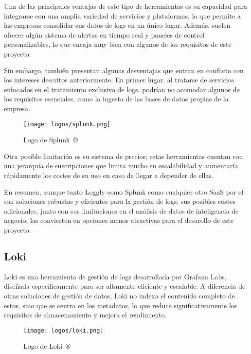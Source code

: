 Una de las principales ventajas de este tipo de herramientas es su capacidad
para integrarse con una amplia variedad de servicios y plataformas, lo que
permite a las empresas consolidar sus datos de logs en un único lugar. Además,
suelen ofrecer algún sistema de alertas en tiempo real y paneles de control
personalizables, lo que encaja muy bien con algunos de los requisitos de este
proyecto.

Sin embargo, también presentan algunas desventajas que entran en conflicto con
los intereses descritos anteriormente. En primer lugar, al tratarse de
servicios enfocados en el tratamiento exclusivo de logs, podrían no acomodar
algunos de los requisitos esenciales, como la ingesta de las bases de datos
propias de la empresa.

\begin{figure}[H]
	\centering
	\texttt{[image: logos/splunk.png]}
	\caption{Logo de Splunk~®}
\end{figure}

Otra posible limitación es su sistema de precios; estas herramientas cuentan con
una jerarquía de suscripciones que limita mucho su escalabilidad y aumentaría
rápidamente los costes de su uso en caso de llegar a depender de ellas.

En resumen, aunque tanto Loggly como Splunk como cualquier otro SaaS por el
son soluciones robustas y eficientes para la gestión de logs, sus posibles
costes adicionales, junto con sus limitaciones en el análisis de datos de
inteligencia de negocio, las convierten en opciones menos atractivas para el
desarollo de este proyecto.

\subsection{Loki}
Loki es una herramienta de gestión de logs desarrollada por Grafana Labs,
diseñada específicamente para ser altamente eficiente y escalable. A diferencia
de otras soluciones de gestión de datos, Loki no indexa el contenido completo de
estos, sino que se centra en los metadatos, lo que reduce significativamente
los requisitos de almacenamiento y mejora el rendimiento.

\begin{figure}[H]
	\centering
	\texttt{[image: logos/loki.png]}
	\caption{Logo de Loki~®}
\end{figure}

